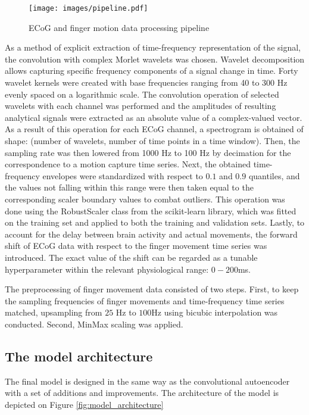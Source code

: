 \documentclass[letterpaper]{article} \usepackage{aaai22}  \usepackage{times}  \usepackage{helvet}  \usepackage{courier}  \usepackage[hyphens]{url}  \usepackage{graphicx} \urlstyle{rm} \def\UrlFont{\rm}  \usepackage{natbib}  \usepackage{caption} \DeclareCaptionStyle{ruled}{labelfont=normalfont,labelsep=colon,strut=off} \frenchspacing  \setlength{\pdfpagewidth}{8.5in}  \setlength{\pdfpageheight}{11in}  \usepackage{algorithm}
\begin{document}
\begin{figure}[ht]
    \centering
    \texttt{[image: images/pipeline.pdf]}
    \caption{ECoG and finger motion data processing pipeline}
    \label{fig:processing_pipeline}
\end{figure}


As a method of explicit extraction of time-frequency representation of the signal, the convolution with complex Morlet wavelets was chosen. Wavelet decomposition allows capturing specific frequency components of a signal change in time. Forty wavelet kernels were created with base frequencies ranging from 40 to 300 Hz evenly spaced on a logarithmic scale. The convolution operation of selected wavelets with each channel was performed and the amplitudes of resulting analytical signals were extracted as an absolute value of a complex-valued vector. As a result of this operation for each ECoG channel, a spectrogram is obtained of shape: (number of wavelets, number of time points in a time window). Then, the sampling rate was then lowered from 1000 Hz to 100 Hz by decimation for the correspondence to a motion capture time series. Next, the obtained time-frequency envelopes were standardized with respect to $0.1$ and $0.9$ quantiles, and the values not falling within this range were then taken equal to the corresponding scaler boundary values to combat outliers. This operation was done using the RobustScaler class from the scikit-learn library, which was fitted on the training set and applied to both the training and validation sets. Lastly, to account for the delay between brain activity and actual movements, the forward shift of ECoG data with respect to the finger movement time series was introduced. The exact value of the shift can be regarded as a tunable hyperparameter within the relevant physiological range: $0 - 200$ms.

The preprocessing of finger movement data consisted of two steps. First, to keep the sampling frequencies of finger movements and time-frequency time series matched,  upsampling from $25$ Hz to $100$Hz using bicubic interpolation was conducted. Second, MinMax scaling was applied.

\subsection{The model architecture}

The final model is designed in the same way as the convolutional autoencoder with a set of additions and improvements. The architecture of the model is depicted on Figure \ref{fig:model_architecture}
\end{document}
